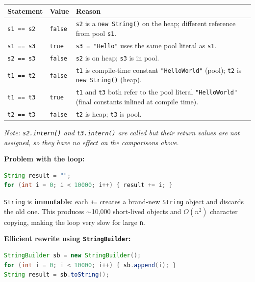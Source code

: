 \documentclass[12pt,a3paper]{article}
\begin{document}
\begin{enumerate}
\begin{tcolorbox}
\begin{center}
\small
\begin{tabularx}{\linewidth}{@{}llX@{}}
\toprule
\textbf{Statement} & \textbf{Value} & \textbf{Reason} \\
\midrule
\texttt{s1 == s2} & \texttt{false} &
  \texttt{s2} is a \texttt{new String()} on the heap; different
  reference from pool \texttt{s1}. \\
\texttt{s1 == s3} & \texttt{true}  &
  \texttt{s3 = "Hello"} uses the same pool literal as \texttt{s1}. \\
\texttt{s2 == s3} & \texttt{false} &
  \texttt{s2} is on heap; \texttt{s3} is in pool. \\
\texttt{t1 == t2} & \texttt{false} &
  \texttt{t1} is compile-time constant \texttt{"HelloWorld"} (pool);
  \texttt{t2} is \texttt{new String()} (heap). \\
\texttt{t1 == t3} & \texttt{true}  &
  \texttt{t1} and \texttt{t3} both refer to the pool literal
  \texttt{"HelloWorld"} (final constants inlined at compile time).\\
\texttt{t2 == t3} & \texttt{false} &
  \texttt{t2} is heap; \texttt{t3} is pool. \\
\bottomrule
\end{tabularx}
\end{center}

\textit{Note: \texttt{s2.intern()} and \texttt{t3.intern()} are
called but their return values are not assigned, so they have no
effect on the comparisons above.}

\medskip
\textbf{Problem with the loop:}

\begin{lstlisting}[language=Java]
String result = "";
for (int i = 0; i < 10000; i++) { result += i; }
\end{lstlisting}

\texttt{String} is \textbf{immutable}: each \texttt{+=} creates a
brand-new \texttt{String} object and discards the old one.  This
produces $\sim$10{,}000 short-lived objects and $O(n^2)$ character
copying, making the loop very slow for large \texttt{n}.

\medskip
\textbf{Efficient rewrite using \texttt{StringBuilder}:}

\begin{lstlisting}[language=Java]
StringBuilder sb = new StringBuilder();
for (int i = 0; i < 10000; i++) { sb.append(i); }
String result = sb.toString();
\end{lstlisting}


\end{tcolorbox}
\end{enumerate}
\end{document}
